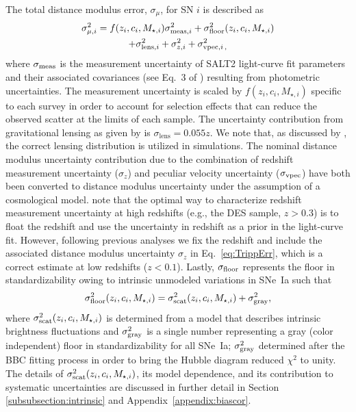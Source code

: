 \documentclass[twocolumn]{aastex63}
\begin{document}
The total distance modulus error, $\sigma_\mu$, for SN $i$ is described as 
\begin{multline}
        \sigma_{\mu,i}^2 = f(z_i,c_i,M_{\star,i})\sigma^2_{{\rm meas},i} + \sigma^2_{\rm floor}(z_i,c_i,M_{\star,i}) \\ + \sigma^2_{{\rm lens},i} + \sigma^2_{{z},i} + \sigma^2_{{\rm vpec},i \, ,} 
    \label{eq:TrippErr}
\end{multline}
where $\sigma_{\rm meas}$ is the measurement uncertainty of SALT2 light-curve fit parameters and their associated covariances (see Eq.~3 of \citealt{BBC}) resulting from photometric uncertainties. The measurement uncertainty is scaled by $f(z_i,c_i,M_{\star,i})$ specific to each survey in order to account for selection effects that can reduce the observed scatter at the limits of each sample. The uncertainty contribution from gravitational lensing as given by \cite{jonsson10} is $\sigma_{\textrm{lens}} = 0.055z$. {We note that, as discussed by \cite{Kessler18}, the correct lensing distribution is utilized in simulations.} The nominal distance modulus uncertainty contribution due to the combination of redshift measurement uncertainty ($\sigma_{z}$) and peculiar velocity uncertainty ($\sigma_{\rm vpec}$) have both been converted to distance modulus uncertainty under the assumption of a cosmological model. {\cite{chen21} note that the optimal way to characterize redshift measurement uncertainty at high redshifts (e.g., the DES sample, $z>0.3$) is to float the redshift and use the uncertainty in redshift as a prior in the light-curve fit. However, following previous analyses we fix the redshift and include the associated distance {modulus} uncertainty $\sigma_{z}$ in Eq.~\ref{eq:TrippErr}, which is a correct estimate at low redshifts ($z<0.1$).}
Lastly, $\sigma_{\rm floor}$ represents the floor in standardizability owing to intrinsic unmodeled variations in SNe~Ia such that
\begin{equation}
\label{eq:errmodel}
   \sigma^2_{\rm floor}(z_i,c_i,M_{\star,i}) = \sigma^2_{\rm scat}(z_i,c_i,M_{\star,i}) + \sigma^2_{\rm gray},
\end{equation}
where $\sigma^2_{\rm scat}(z_i,c_i,M_{\star,i})$ is determined from a model that describes intrinsic brightness fluctuations { and $\sigma^2_{\rm gray}$ is a single number representing a gray (color independent) floor in standardizability for all SNe~Ia; $\sigma^2_{\rm gray}$ determined after the BBC fitting process in order to bring the Hubble diagram reduced $\chi^2$ to unity. The details of $\sigma^2_{\rm scat}(z_i,c_i,M_{\star,i})$, its model dependence, and its contribution to systematic uncertainties are discussed in further detail in Section \ref{subsubsection:intrinsic} and Appendix~\ref{appendix:biascor}.} 
\end{document}
